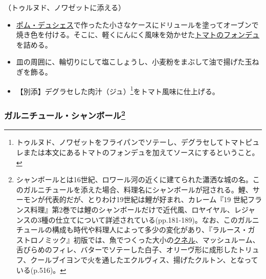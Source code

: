 \begin{recette}


（トゥルヌド、ノワゼットに添える）

\begin{itemize}
\item
  \protect\hyperlink{pommes-de-terre-duchesse}{ポム・デュシェス}で作ったた小さなケースにドリュールを塗ってオーブンで焼き色を付ける。そこに、軽くにんにく風味を効かせた\protect\hyperlink{portugaise}{トマトのフォンデュ}を詰める。
\item
  皿の周囲に、輪切りにして塩こしょうし、小麦粉をまぶして油で揚げた玉ねぎを飾る。
\item
  【別添】デグラセした肉汁（ジュ）\footnote{トゥルヌド、ノワゼットをフライパンでソテーし、デグラセしてトマトピュレまたは本文にあるトマトのフォンデュを加えてソースにするということ。}をトマト風味に仕上げる。
\end{itemize}

\atoaki{}

\hypertarget{garniture-chambord}{%
\subsubsection[ガルニチュール・シャンボール]{\texorpdfstring{ガルニチュール・シャンボール\footnote{シャンボールとは16世紀、ロワール河の近くに建てられた瀟洒な城の名。このガルニチュールを添えた場合、料理名にシャンボールが冠される。鯉、サーモンが代表的だが、とりわけ19世紀は鯉が好まれ、カレーム『19
  世紀フランス料理』第2巻では鯉のシャンボールだけで近代風、ロヤイヤル、レジャンスの3種の仕立てについて詳述されている(pp.181-189)。なお、このガルニチュールの構成も時代や料理人によって多少の変化があり、『ラルース・ガストロノミック』初版では、魚でつくった大小の\protect\hyperlink{quenelles}{クネル}、マッシュルーム、舌びらめのフィレ、バターでソテーした白子、オリーヴ形に成形したトリュフ、クールブイヨンで火を通したエクルヴィス、揚げたクルトン、となっている(p.516)。}}{ガルニチュール・シャンボール}}\label{garniture-chambord}}




\end{recette}
